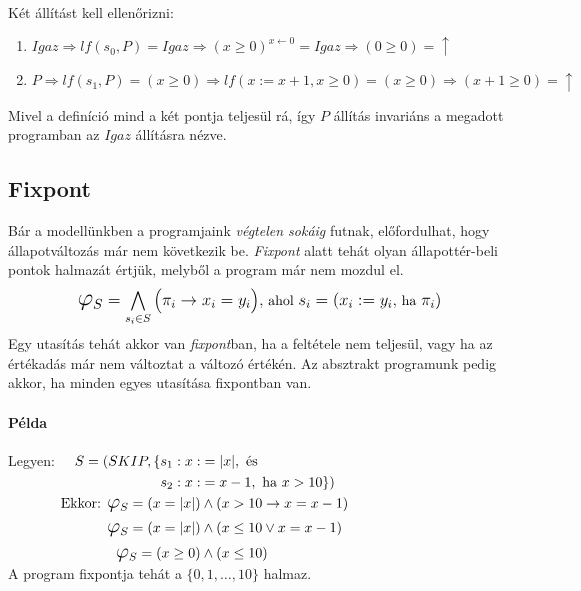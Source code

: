 \documentclass[12pt]{article}
\begin{document}
	\paragraph{}
	Két állítást kell ellenőrizni:
	\begin{enumerate}
		\item $Igaz \Rightarrow lf(s_0, P) = Igaz \Rightarrow (x\ge0)^{x\leftarrow 0}= Igaz \Rightarrow (0\ge0) = \uparrow$
		\item $ P \Rightarrow lf(s_1, P) = (x\ge0) \Rightarrow lf(x:=x+1, x\ge0) = (x\ge0) \Rightarrow (x+1\ge 0) = \uparrow$
	\end{enumerate}
	
	Mivel a definíció mind a két pontja teljesül rá, így $P$ állítás invariáns a megadott programban az $Igaz$ állításra nézve.
	
	\subsection{Fixpont}
	Bár a modellünkben a programjaink \textit{végtelen sokáig} futnak, előfordulhat, hogy állapotváltozás már nem következik be. \textit{Fixpont} alatt tehát olyan állapottér-beli pontok halmazát értjük, melyből a program már nem mozdul el. 
	$$\mathlarger{\mathlarger{\mathlarger{\varphi}}_S =\bigwedge_{s_i  \in S} \big( \pi_i \rightarrow x_i = y_i \big),} \text{ ahol } \mathlarger{s_i = (x_i := y_i, }\text{ ha }\mathlarger{ \pi_i)}$$
	Egy utasítás tehát akkor van \textit{fixpont}ban, ha a feltétele nem teljesül, vagy ha az értékadás már nem változtat a változó értékén. Az absztrakt programunk pedig akkor, ha minden egyes utasítása fixpontban van.
	
	\paragraph{Példa}
	Legyen: 
	$
	\begin{aligned}[t]
	S = (SKIP, \{s_1: x :&= |x|, \text{ és}\\
	s_2: x :&= x-1, \text{ ha } x > 10\})\\
	\text{Ekkor: }\mathlarger{\mathlarger{\varphi}}_S = (x = |x|) &\land (x>10 \rightarrow x = x-1)\\
	\mathlarger{\mathlarger{\varphi}}_S = (x = |x|) &\land (x \le 10 \lor x = x-1)\\
	\mathlarger{\mathlarger{\varphi}}_S = (x \ge 0) &\land (x \le 10)\\
	\end{aligned}
	$\\
	A program fixpontja tehát a $\{0, 1, \dots, 10 \}$ halmaz.
	
\end{document}
